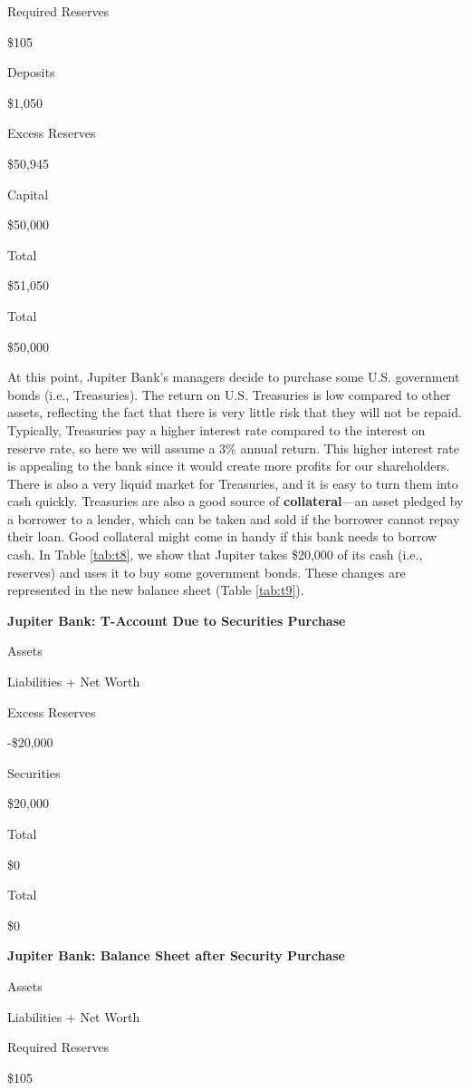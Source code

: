 \documentclass[
]{book}
\begin{document}
Required Reserves

\$105

Deposits

\$1,050

Excess Reserves

\$50,945

Capital

\$50,000

Total

\$51,050

Total

\$50,000

At this point, Jupiter Bank's managers decide to purchase some U.S. government bonds (i.e., Treasuries). The return on U.S. Treasuries is low compared to other assets, reflecting the fact that there is very little risk that they will not be repaid. Typically, Treasuries pay a higher interest rate compared to the interest on reserve rate, so here we will assume a 3\% annual return. This higher interest rate is appealing to the bank since it would create more profits for our shareholders. There is also a very liquid market for Treasuries, and it is easy to turn them into cash quickly. Treasuries are also a good source of \textbf{collateral}---an asset pledged by a borrower to a lender, which can be taken and sold if the borrower cannot repay their loan. Good collateral might come in handy if this bank needs to borrow cash. In Table \ref{tab:t8}, we show that Jupiter takes \$20,000 of its cash (i.e., reserves) and uses it to buy some government bonds. These changes are represented in the new balance sheet (Table \ref{tab:t9}).

\label{tab:t8}\textbf{Jupiter Bank: T-Account Due to Securities Purchase}

Assets

Liabilities + Net Worth

Excess Reserves

-\$20,000

Securities

\$20,000

Total

\$0

Total

\$0

\label{tab:t9}\textbf{Jupiter Bank: Balance Sheet after Security Purchase}

Assets

Liabilities + Net Worth

Required Reserves

\$105
\end{document}
